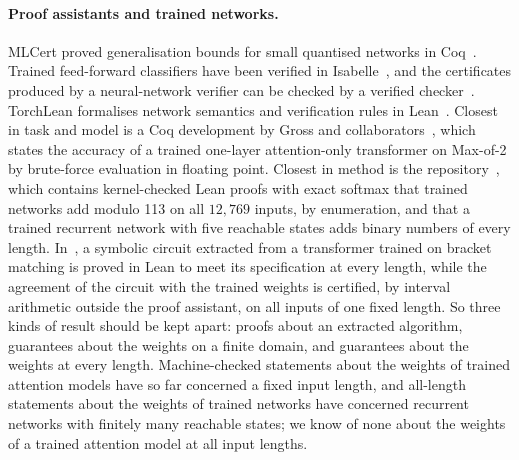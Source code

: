 \documentclass[11pt,a4paper]{article}
\begin{document}
\paragraph{Proof assistants and trained networks.}
MLCert proved generalisation bounds for small quantised networks in
Coq~\cite{bagnall2019certifying}. Trained feed-forward classifiers have been
verified in Isabelle~\cite{brucker2023isabelle}, and the certificates produced
by a neural-network verifier can be checked by a verified
checker~\cite{desmartin2025imandra}. TorchLean formalises network semantics and
verification rules in Lean~\cite{george2026torchlean}. Closest in task and
model is a Coq development by Gross and collaborators~\cite{gross2023coqinterp},
which states the accuracy of a trained one-layer attention-only transformer on
Max-of-2 by brute-force evaluation in floating point. Closest in method is the
repository~\cite{tealsea2026}, which contains kernel-checked Lean proofs with
exact softmax that trained networks add modulo 113 on all $12{,}769$ inputs, by
enumeration, and that a trained recurrent network with five reachable states
adds binary numbers of every length. In~\cite{naughton2026verified}, a symbolic
circuit extracted from a transformer trained on bracket matching is proved in
Lean to meet its specification at every length, while the agreement of the
circuit with the trained weights is certified, by interval arithmetic outside
the proof assistant, on all inputs of one fixed length. So three kinds of
result should be kept apart: proofs about an extracted algorithm, guarantees
about the weights on a finite domain, and guarantees about the weights at every
length. Machine-checked statements about the weights of trained attention
models have so far concerned a fixed input length, and all-length statements
about the weights of trained networks have concerned recurrent networks with
finitely many reachable states; we know of none about the weights of a trained
attention model at all input lengths.
\end{document}
